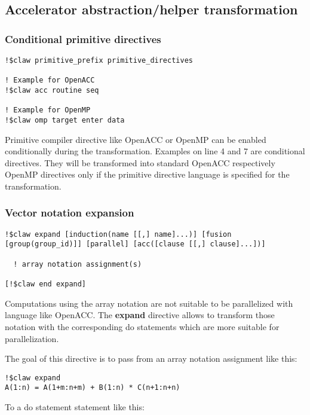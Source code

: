 \subsection{Accelerator abstraction/helper transformation}

\subsubsection{Conditional primitive directives}
\begin{lstlisting}
!$claw primitive_prefix primitive_directives

! Example for OpenACC
!$claw acc routine seq

! Example for OpenMP
!$claw omp target enter data
\end{lstlisting}

Primitive compiler directive like OpenACC or OpenMP can be enabled conditionally
during the transformation. Examples on line 4 and 7 are conditional directives.
They will be transformed into standard OpenACC respectively OpenMP directives
only if the primitive directive language is specified for the transformation.

\subsubsection{Vector notation expansion}
\begin{lstlisting}
!$claw expand [induction(name [[,] name]...)] [fusion [group(group_id)]] [parallel] [acc([clause [[,] clause]...])]

  ! array notation assignment(s)

[!$claw end expand]
\end{lstlisting}

Computations using the array notation are not suitable to be parallelized with
language like OpenACC. The \textbf{expand} directive allows to
transform those notation with the corresponding do statements which are more
suitable for parallelization.

The goal of this directive is to pass from an array notation assignment like
this:

\begin{lstlisting}
!$claw expand
A(1:n) = A(1+m:n+m) + B(1:n) * C(n+1:n+n)
\end{lstlisting}

To a do statement statement like this:

